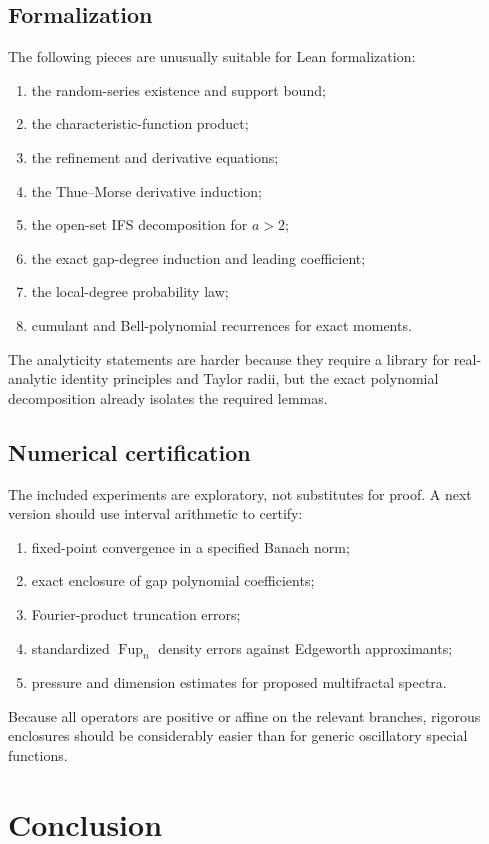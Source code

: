 \documentclass[11pt]{article}
\theoremstyle{definition}
\theoremstyle{remark}
\newcommand{\Fup}{\operatorname{Fup}}
\begin{document}
\subsection{Formalization}

The following pieces are unusually suitable for Lean formalization:
\begin{enumerate}
  \item the random-series existence and support bound;
  \item the characteristic-function product;
  \item the refinement and derivative equations;
  \item the Thue--Morse derivative induction;
  \item the open-set IFS decomposition for \(a>2\);
  \item the exact gap-degree induction and leading coefficient;
  \item the local-degree probability law;
  \item cumulant and Bell-polynomial recurrences for exact moments.
\end{enumerate}
The analyticity statements are harder because they require a library for real-analytic identity principles and Taylor radii, but the exact polynomial decomposition already isolates the required lemmas.

\subsection{Numerical certification}

The included experiments are exploratory, not substitutes for proof.  A next version should use interval arithmetic to certify:
\begin{enumerate}
  \item fixed-point convergence in a specified Banach norm;
  \item exact enclosure of gap polynomial coefficients;
  \item Fourier-product truncation errors;
  \item standardized \(\Fup_n\) density errors against Edgeworth approximants;
  \item pressure and dimension estimates for proposed multifractal spectra.
\end{enumerate}
Because all operators are positive or affine on the relevant branches, rigorous enclosures should be considerably easier than for generic oscillatory special functions.

\section{Conclusion}
\end{document}
